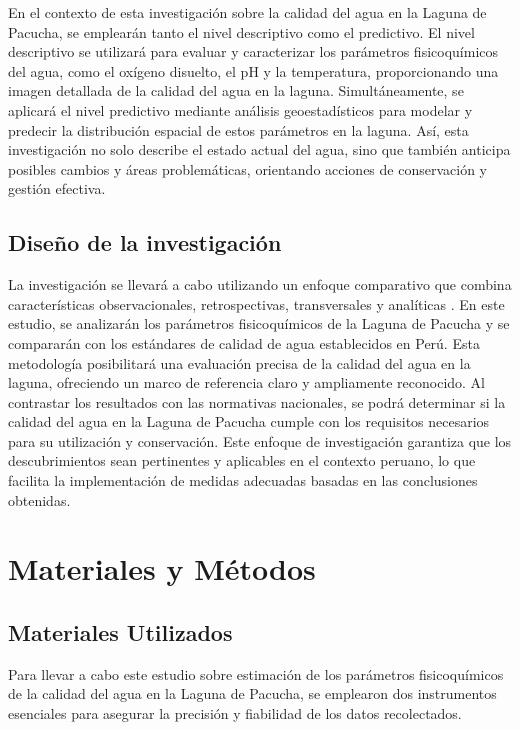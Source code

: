 En el contexto de esta investigación sobre la calidad del agua en la Laguna de Pacucha, se emplearán tanto el nivel descriptivo como el predictivo. El nivel descriptivo se utilizará para evaluar y caracterizar los parámetros fisicoquímicos del agua, como el oxígeno disuelto, el pH y la temperatura, proporcionando una imagen detallada de la calidad del agua en la laguna. Simultáneamente, se aplicará el nivel predictivo mediante análisis geoestadísticos para modelar y predecir la distribución espacial de estos parámetros en la laguna. Así, esta investigación no solo describe el estado actual del agua, sino que también anticipa posibles cambios y áreas problemáticas, orientando acciones de conservación y gestión efectiva.


\subsection{ Diseño de la investigación}
La investigación se llevará a cabo utilizando un enfoque comparativo que combina características observacionales, retrospectivas, transversales y analíticas \cite{shadish2002experimental}. En este estudio, se analizarán los parámetros fisicoquímicos de la Laguna de Pacucha y se compararán con los estándares de calidad de agua establecidos en Perú. Esta metodología posibilitará una evaluación precisa de la calidad del agua en la laguna, ofreciendo un marco de referencia claro y ampliamente reconocido. Al contrastar los resultados con las normativas nacionales, se podrá determinar si la calidad del agua en la Laguna de Pacucha cumple con los requisitos necesarios para su utilización y conservación. Este enfoque de investigación garantiza que los descubrimientos sean pertinentes y aplicables en el contexto peruano, lo que facilita la implementación de medidas adecuadas basadas en las conclusiones obtenidas.

\section{Materiales y Métodos}

\subsection{Materiales Utilizados}

Para llevar a cabo este estudio sobre estimación de los parámetros fisicoquímicos de la calidad del agua en la Laguna de Pacucha, se emplearon dos instrumentos esenciales para asegurar la precisión y fiabilidad de los datos recolectados.

